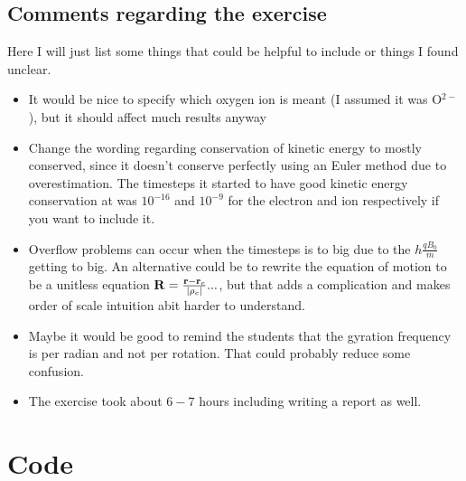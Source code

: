 \documentclass[x11names]{article}
\begin{document}
            

\subsection{Comments regarding the exercise}
      Here I will just list some things that could be helpful to include or things I found unclear.

      \begin{itemize}
            \item It would be nice to specify which oxygen ion is meant (I assumed it was O\(^{2-}\)), but it should affect much results anyway
            \item Change the wording regarding conservation of kinetic energy to mostly conserved, since it doesn't conserve perfectly using an Euler method due to overestimation. The timesteps it started to have good kinetic energy conservation at was \(10^{-16}\) and \( 10^{-9} \) for the electron and ion respectively if you want to include it.
            \item Overflow problems can occur when the timesteps is to big due to the \(  h\frac{qB_0}{m}  \) getting to big. An alternative could be to rewrite the equation of motion to be a unitless equation 
            \( \vb{R} = \frac{\vb{r}-\vb{r}_c}{|\rho_c|}... \), but that adds a complication and makes order of scale intuition abit harder to understand.
            \item Maybe it would be good to remind the students that the gyration frequency is per radian and not per rotation. That could probably reduce some confusion.
            \item The exercise took about $6-7$ hours including writing a report as well.
      \end{itemize}

\appendix
\section{Code}
      

      
\end{document}
